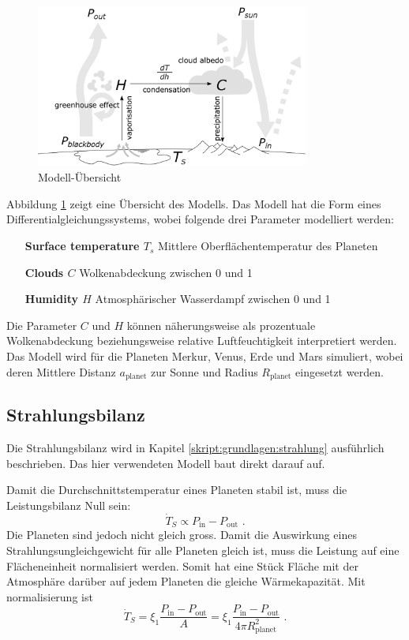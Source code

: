 \begin{refsection}
\begin{figure}
	\centering
	\includegraphics[width=0.8\textwidth]{planeten/Pictures/Model.eps}
	\caption{Modell-Übersicht}
	\label{planeten:model}
\end{figure}
Abbildung \ref{planeten:model} zeigt eine Übersicht des Modells.
Das Modell hat die Form eines Differentialgleichungssystems, wobei folgende drei Parameter modelliert werden:
\begin{itemize}
\item [\textbf{Surface temperature $T_s$}]	Mittlere Oberflächentemperatur des Planeten
\item [\textbf{Clouds $C$}]		Wolkenabdeckung zwischen 0 und 1
\item [\textbf{Humidity $H$}]		Atmosphärischer Wasserdampf zwischen 0 und 1
\end{itemize}
Die Parameter $C$ und $H$ können näherungsweise als prozentuale Wolkenabdeckung beziehungsweise relative Luftfeuchtigkeit  interpretiert werden.
Das Modell wird für die Planeten Merkur, Venus, Erde und Mars simuliert, wobei deren Mittlere Distanz $a_\text{planet}$ zur Sonne und Radius $R_\text{planet}$ eingesetzt werden.

\subsection{Strahlungsbilanz}
Die Strahlungsbilanz wird in Kapitel \ref{skript:grundlagen:strahlung} ausführlich beschrieben. Das hier verwendeten Modell baut direkt darauf auf.

Damit die Durchschnittstemperatur eines Planeten stabil ist, muss die Leistungsbilanz Null sein:
\begin{equation}
\dot{T}_S \propto P_{\text{in}} - P_{\text{out}}\text{ .}
\end{equation}
Die Planeten sind jedoch nicht gleich gross. Damit die Auswirkung eines Strahlungsungleichgewicht für alle Planeten gleich ist, muss die Leistung auf eine Flächeneinheit normalisiert werden. Somit hat eine Stück Fläche mit der Atmosphäre darüber auf jedem Planeten die gleiche Wärmekapazität. Mit normalisierung ist
\begin{equation}
\dot{T}_S = \xi_1 \frac{P_{\text{in}} - P_{\text{out}}}{A} = \xi_1 \frac{P_{\text{in}} - P_{\text{out}}}{4 \pi R_{\text{planet}}^2}\text{ .}
\end{equation}


\end{refsection}
